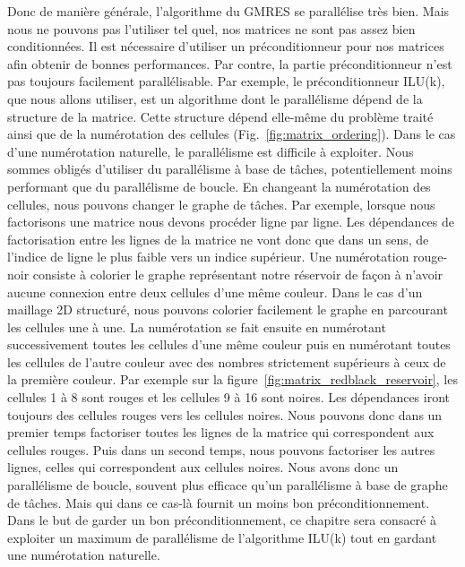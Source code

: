 Donc de manière générale, l'algorithme du GMRES se parallélise très bien.
%
Mais nous ne pouvons pas l'utiliser tel quel, nos matrices ne sont pas assez bien conditionnées.
%
Il est nécessaire d'utiliser un préconditionneur pour nos matrices afin obtenir de bonnes performances.
%
Par contre, la partie préconditionneur n'est pas toujours facilement parallélisable.
%
Par exemple, le préconditionneur ILU(k), que nous allons utiliser, est un algorithme dont le parallélisme dépend de la structure de la matrice.
%
Cette structure dépend elle-même du problème traité ainsi que de la numérotation des cellules (Fig.~\ref{fig:matrix_ordering}).
%
Dans le cas d'une numérotation naturelle, le parallélisme est difficile à exploiter.
%
Nous sommes obligés d'utiliser du parallélisme à base de tâches, potentiellement moins performant que du parallélisme de boucle.
%
En changeant la numérotation des cellules, nous pouvons changer le graphe de tâches.
%
Par exemple, lorsque nous factorisons une matrice nous devons procéder ligne par ligne.
%
Les dépendances de factorisation entre les lignes de la matrice ne vont donc que dans un sens, de l'indice de ligne le plus faible vers un indice supérieur.
%
Une numérotation rouge-noir consiste à colorier le graphe représentant notre réservoir de façon à n'avoir aucune connexion entre deux cellules d'une même couleur.
%
Dans le cas d'un maillage 2D structuré, nous pouvons colorier facilement le graphe en parcourant les cellules une à une.
%
La numérotation se fait ensuite en numérotant successivement toutes les cellules d'une même couleur puis en numérotant toutes les cellules de l'autre couleur avec des nombres strictement supérieurs à ceux de la première couleur.
%
Par exemple sur la figure~\ref{fig:matrix_redblack_reservoir}, les cellules 1 à 8 sont rouges et les cellules 9 à 16 sont noires.
%
Les dépendances iront toujours des cellules rouges vers les cellules noires.
%
Nous pouvons donc dans un premier temps factoriser toutes les lignes de la matrice qui correspondent aux cellules rouges.
%
Puis dans un second temps, nous pouvons factoriser les autres lignes, celles qui correspondent aux cellules noires.
%
Nous avons donc un parallélisme de boucle, souvent plus efficace qu'un parallélisme à base de graphe de tâches.
%
Mais qui dans ce cas-là fournit un moins bon préconditionnement\cite{red_black_ilu2}.
%
Dans le but de garder un bon préconditionnement, ce chapitre sera consacré à exploiter un maximum de parallélisme de l'algorithme ILU(k) tout en gardant une numérotation naturelle.
